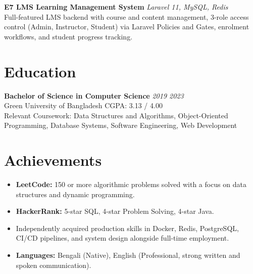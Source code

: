 \documentclass[a4paper,10.5pt]{article}
\begin{document}
\vspace{4pt}

\textbf{E7 LMS \textemdash{} Learning Management System} \hfill \textit{Laravel 11, MySQL, Redis}\\
Full-featured LMS backend with course and content management, 3-role access control (Admin, Instructor, Student) via Laravel Policies and Gates, enrolment workflows, and student progress tracking.

\vspace{2pt}

\section{Education}
\vspace{2pt}

\textbf{Bachelor of Science in Computer Science} \hfill \textit{2019 \textemdash{} 2023}\\
Green University of Bangladesh \hfill CGPA: 3.13 / 4.00\\
{\small Relevant Coursework: Data Structures and Algorithms, Object-Oriented Programming, Database Systems, Software Engineering, Web Development}

\vspace{2pt}

\section{Achievements}
\vspace{2pt}

\begin{itemize}[noitemsep, topsep=0pt, leftmargin=1.3em, label={$\bullet$}]
  \item \textbf{LeetCode:} 150 or more algorithmic problems solved with a focus on data structures and dynamic programming.
  \item \textbf{HackerRank:} 5-star SQL, 4-star Problem Solving, 4-star Java.
  \item Independently acquired production skills in Docker, Redis, PostgreSQL, CI/CD pipelines, and system design alongside full-time employment.
  \item \textbf{Languages:} Bengali (Native), English (Professional, strong written and spoken communication).
\end{itemize}
\end{document}
